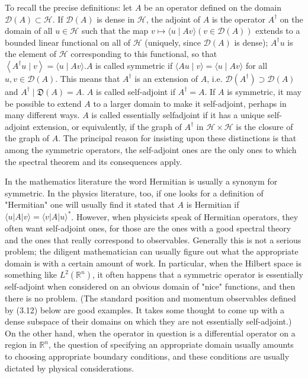 \documentclass[10pt, letterpaper]{article}
\begin{document}
To recall the precise definitions: let $A$ be an operator defined on the domain $\mathcal{D}(A) \subset \mathcal{H}$. If $\mathcal{D}(A)$ is dense in $\mathcal{H}$, the adjoint of $A$ is the operator $A^{\dagger}$ on the domain of all $u \in \mathcal{H}$ such that the map $v \mapsto\langle u \mid A v\rangle(v \in \mathcal{D}(A))$ extends to a bounded linear functional on all of $\mathcal{H}$ (uniquely, since $\mathcal{D}(A)$ is dense); $A^{\dagger} u$ is the element of $\mathcal{H}$ corresponding to this functional, so that $\left\langle A^{\dagger} u \mid v\right\rangle=\langle u \mid A v\rangle . A$ is called symmetric if $\langle A u \mid v\rangle=\langle u \mid A v\rangle$ for all $u, v \in \mathcal{D}(A)$. This means that $A^{\dagger}$ is an extension of $A$, i.e. $\mathcal{D}\left(A^{\dagger}\right) \supset \mathcal{D}(A)$ and $A^{\dagger} \mid \mathfrak{D}(A)=A$. $A$ is called self-adjoint if $A^{\dagger}=A$. If $A$ is symmetric, it may be possible to extend $A$ to a larger domain to make it self-adjoint, perhaps in many different ways. $A$ is called essentially selfadjoint if it has a unique self-adjoint extension, or equivalently, if the graph of $A^{\dagger}$ in $\mathcal{H} \times \mathcal{H}$ is the closure of the graph of $A$. The principal reason for insisting upon these distinctions is that among the symmetric operators, the self-adjoint ones are the only ones to which the spectral theorem and its consequences apply.

In the mathematics literature the word Hermitian is usually a synonym for symmetric. In the physics literature, too, if one looks for a definition of "Hermitian" one will usually find it stated that $A$ is Hermitian if $\langle u| A|v\rangle=\langle v| A|u\rangle^{*}$. However, when physicists speak of Hermitian operators, they often want self-adjoint ones, for those are the ones with a good spectral theory and the ones that really correspond to observables. Generally this is not a serious problem; the diligent mathematician can usually figure out what the appropriate domain is with a certain amount of work. In particular, when the Hilbert space is something like $L^{2}\left(\mathbb{R}^{n}\right)$, it often happens that a symmetric operator is essentially self-adjoint when considered on an obvious domain of "nice" functions, and then there is no problem. (The standard position and momentum observables defined by (3.12) below are good examples. It takes some thought to come up with a dense subspace of their domains on which they are not essentially self-adjoint.) On the other hand, when the operator in question is a differential operator on a region in $\mathbb{R}^{n}$, the question of specifying an appropriate domain usually amounts to choosing appropriate boundary conditions, and these conditions are usually dictated by physical considerations.
\end{document}
